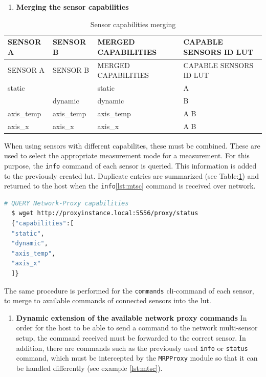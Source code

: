 \begin{enumerate}
\def\labelenumi{\arabic{enumi}.}
\setcounter{enumi}{1}
\tightlist
\item
  \textbf{Merging the sensor capabilities}
\end{enumerate}

\begin{longtable}[]{@{}llll@{}}
\caption{Sensor capabilities merging
\label{Sensor_capabilities_merging.csv}}\tabularnewline
\toprule
SENSOR A & SENSOR B & MERGED CAPABILITIES & CAPABLE SENSORS ID
LUT\tabularnewline
\midrule
\endfirsthead
\toprule
SENSOR A & SENSOR B & MERGED CAPABILITIES & CAPABLE SENSORS ID
LUT\tabularnewline
\midrule
\endhead
static & & static & A\tabularnewline
& dynamic & dynamic & B\tabularnewline
axis\_temp & axis\_temp & axis\_temp & A B\tabularnewline
axis\_x & axis\_x & axis\_x & A B\tabularnewline
\bottomrule
\end{longtable}

When using sensors with different capabilites, these must be combined.
These are used to select the appropriate measurement mode for a
measurement. For this purpose, the \passthrough{\lstinline!info!}
command of each sensor is queried. This information is added to the
previously created \gls{lut}. Duplicate entries are summarized (see
Table:\ref{Sensor_capabilities_merging.csv}) and returned to the host
when the \passthrough{\lstinline!info!}\ref{lst:mtsc} command is
received over network.

\begin{lstlisting}[language=bash, caption={MRPproxy REST enpoiint query examples}, label=lst:mtsc]
  # QUERY Network-Proxy capabilities
  $ wget http://proxyinstance.local:5556/proxy/status
  {"capabilities":[
  "static",
  "dynamic",
  "axis_temp",
  "axis_x"
  ]}
\end{lstlisting}

The same procedure is performed for the
\passthrough{\lstinline!commands!} \gls{cli}-command of each sensor, to
merge to available commands of connected sensors into the \gls{lut}.

\begin{enumerate}
\def\labelenumi{\arabic{enumi}.}
\setcounter{enumi}{2}
\tightlist
\item
  \textbf{Dynamic extension of the available network proxy commands} In
  order for the host to be able to send a command to the network
  multi-sensor setup, the command received must be forwarded to the
  correct sensor. In addition, there are commands such as the previously
  used \passthrough{\lstinline!info!} or
  \passthrough{\lstinline!status!} command, which must be intercepted by
  the \passthrough{\lstinline!MRPProxy!} module so that it can be
  handled differently (see example \ref{lst:mtsc}).
\end{enumerate}


